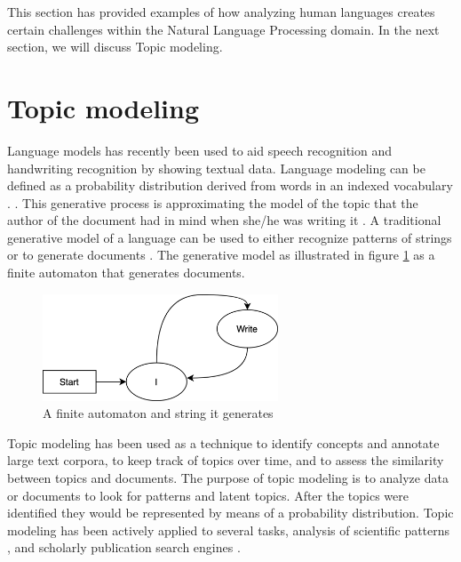 This section has provided examples of how analyzing human languages creates certain challenges within the Natural Language Processing domain. In the next section, we will discuss Topic modeling.
\section{Topic modeling} \label{ssec:tmodel}

Language models has recently been used to aid speech recognition and handwriting recognition by showing textual data. Language modeling can be defined as a probability distribution derived from words in an indexed vocabulary \cite{croft2010search}.
 \cite{titov2008modeling}.
This generative process is approximating the model of the topic that the author of the document had in mind when she/he was writing it \cite{raghuveer2012legal}.
A traditional generative model of a language can be used to either recognize patterns of strings or to generate documents \cite{Sajjadi2018AssessingGM}. The generative model as illustrated in figure \ref{fig:automon} as a finite automaton that generates documents.
\begin{figure}[htbp]
\centering
\includegraphics[width=7cm]{./figures/automon8.png}
\caption{A finite automaton and string it generates}
\label{fig:automon}
\end{figure}
Topic modeling has been used as a technique to identify concepts and annotate large text corpora, to keep track of topics over time, and to assess the similarity between topics and  documents. 
The purpose of topic modeling is to analyze data or documents to look for patterns and latent topics. After the topics were identified they would be represented by means of a probability distribution. Topic modeling has been actively applied to several tasks, analysis of scientific patterns  \cite{lau2012line,yi2009comparative,wei2006lda,yi2009comparative}, and scholarly publication search engines \cite{newman2010evaluating}.

